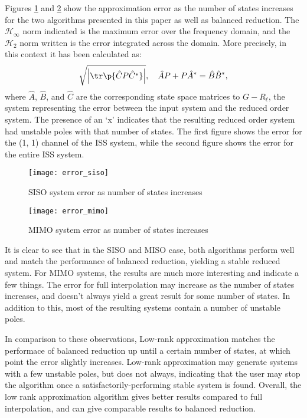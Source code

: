 \documentclass[letterpaper, 10 pt, conference]{ieeeconf}  %
\newcommand{\mcal}[1]{\mathcal{#1}}
\begin{document}
Figures \ref{error_siso} and \ref{error_mimo} show the approximation error as the number of states increases for the two algorithms presented in this paper as well as balanced reduction.  The \(\mcal{H}_\infty\) norm indicated is the maximum error over the frequency domain, and the \(\mcal{H}_2\) norm written is the error integrated across the domain.  More precisely, in this context it has been calculated as:
\[\sqrt{\left|\tr\p{\hat{C}P\hat{C}^*}\right|}, \quad \hat{A}P + P\hat{A}^* = \hat{B}\hat{B}^*, \]
where \(\hat{A}\), \(\hat{B}\), and \(\hat{C}\) are the corresponding state space matrices to \(G-R_\ell\), the system representing the error between the input system and the reduced order system.  The presence of an `x' indicates that the resulting reduced order system had unstable poles with that number of states.  The first figure shows the error for the (1, 1) channel of the ISS system, while the second figure shows the error for the entire ISS system.  
\begin{figure}[ht!]
        \texttt{[image: error\_siso]}
        \caption{SISO system error as number of states increases}
        \label{error_siso}
\end{figure}

\begin{figure}[ht!]
        \texttt{[image: error\_mimo]}
        \caption{MIMO system error as number of states increases}
        \label{error_mimo}
\end{figure}

It is clear to see that in the SISO and MISO case, both algorithms perform well and match the performance of balanced reduction, yielding a stable reduced system.  For MIMO systems, the results are much more interesting and indicate a few things.  The error for full interpolation may increase as the number of states increases, and doesn't always yield a great result for some number of states.  In addition to this, most of the resulting systems contain a number of unstable poles.  

In comparison to these observations, Low-rank approximation matches the performace of balanced reduction up until a certain number of states, at which point the error slightly increases.  Low-rank approximation may generate systems with a few unstable poles, but does not always, indicating that the user may stop the algorithm once a satisfactorily-performing stable system is found.  Overall, the low rank approximation algorithm gives better results compared to full interpolation, and can give comparable results to balanced reduction.  
\end{document}
